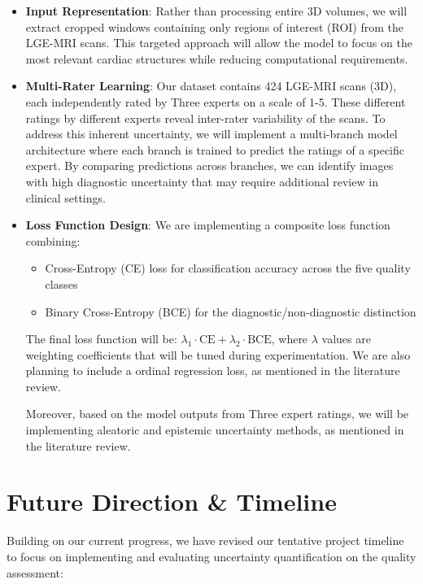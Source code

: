\documentclass{report}
\begin{document}
\begin{itemize}
    \item \textbf{Input Representation}: Rather than processing entire 3D volumes, we will extract cropped windows containing only regions of interest (ROI) from the LGE-MRI scans. This targeted approach will allow the model to focus on the most relevant cardiac structures while reducing computational requirements.

    \item \textbf{Multi-Rater Learning}: Our dataset contains 424 LGE-MRI scans (3D), each independently rated by Three experts on a scale of 1-5. These different ratings by different experts reveal inter-rater variability of the scans. To address this inherent uncertainty, we will implement a multi-branch model architecture where each branch is trained to predict the ratings of a specific expert. By comparing predictions across branches, we can identify images with high diagnostic uncertainty that may require additional review in clinical settings.

    \item \textbf{Loss Function Design}: We are implementing a composite loss function combining:
    \begin{itemize}
    \item Cross-Entropy (CE) loss for classification accuracy across the five quality classes
    \item Binary Cross-Entropy (BCE) for the diagnostic/non-diagnostic distinction
    \end{itemize}
    The final loss function will be: $\lambda_1 \cdot \text{CE} + \lambda_2 \cdot \text{BCE}$, where $\lambda$ values are weighting coefficients that will be tuned during experimentation. We are also planning to include a ordinal regression loss, as mentioned in the literature review.
    
    Moreover, based on the model outputs from Three expert ratings, we will be implementing aleatoric and epistemic uncertainty methods, as mentioned in the literature review.
\end{itemize}

\section*{Future Direction \& Timeline}

Building on our current progress, we have revised our tentative project timeline to focus on implementing and evaluating uncertainty quantification on the quality assessment: \\
\end{document}
